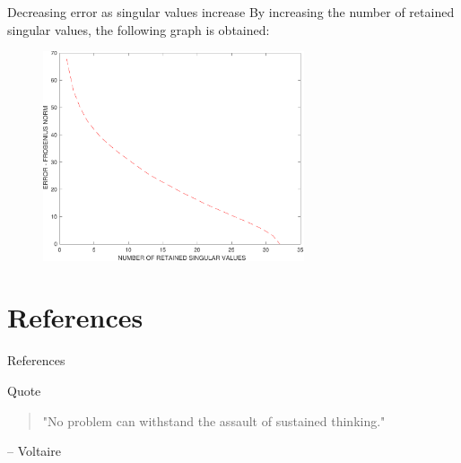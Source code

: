 \documentclass[10pt]{beamer}
\begin{document}
\begin{frame}{Decreasing error as singular values increase}
    By increasing the number of retained singular values, the following graph is obtained:
    \begin{figure}[t]
        \includegraphics[width=7.7cm]{error_wrt_A.pdf}
        \centering
    \end{figure}
\end{frame}

\section{References}
\begin{frame}{References}
    \printbibliography
\end{frame}

\begin{frame}{Quote}
    \begin{quote}
        \hfill "No problem can withstand the assault of sustained thinking."
    \end{quote}
    \hfill -- Voltaire
\end{frame}
\end{document}
